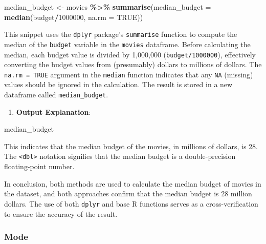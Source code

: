 \documentclass[
]{book}
\newenvironment{Shaded}{\begin{snugshade}}{\end{snugshade}}
\newcommand{\AttributeTok}[1]{\textcolor[rgb]{0.13,0.29,0.53}{#1}}
\newcommand{\ConstantTok}[1]{\textcolor[rgb]{0.56,0.35,0.01}{#1}}
\newcommand{\DecValTok}[1]{\textcolor[rgb]{0.00,0.00,0.81}{#1}}
\newcommand{\FunctionTok}[1]{\textcolor[rgb]{0.13,0.29,0.53}{\textbf{#1}}}
\newcommand{\NormalTok}[1]{#1}
\newcommand{\OtherTok}[1]{\textcolor[rgb]{0.56,0.35,0.01}{#1}}
\newcommand{\SpecialCharTok}[1]{\textcolor[rgb]{0.81,0.36,0.00}{\textbf{#1}}}
\providecommand{\tightlist}{%
  \setlength{\itemsep}{0pt}\setlength{\parskip}{0pt}}
\begin{document}
\begin{Shaded}
\begin{Highlighting}[]
\NormalTok{median\_budget }\OtherTok{\textless{}{-}}\NormalTok{ movies }\SpecialCharTok{\%\textgreater{}\%}
  \FunctionTok{summarise}\NormalTok{(}\AttributeTok{median\_budget =} \FunctionTok{median}\NormalTok{(budget}\SpecialCharTok{/}\DecValTok{1000000}\NormalTok{, }\AttributeTok{na.rm =} \ConstantTok{TRUE}\NormalTok{))}
\end{Highlighting}
\end{Shaded}

This snippet uses the \texttt{dplyr} package's \texttt{summarise} function to compute the median of the \texttt{budget} variable in the \texttt{movies} dataframe. Before calculating the median, each budget value is divided by 1,000,000 (\texttt{budget/1000000}), effectively converting the budget values from (presumably) dollars to millions of dollars. The \texttt{na.rm\ =\ TRUE} argument in the \texttt{median} function indicates that any \texttt{NA} (missing) values should be ignored in the calculation. The result is stored in a new dataframe called \texttt{median\_budget}.

\begin{enumerate}
\def\labelenumi{\arabic{enumi}.}
\setcounter{enumi}{1}
\tightlist
\item
  \textbf{Output Explanation}:
\end{enumerate}

\begin{Shaded}
\begin{Highlighting}[]
\NormalTok{median\_budget}
\end{Highlighting}
\end{Shaded}

This indicates that the median budget of the movies, in millions of dollars, is 28. The \texttt{\textless{}dbl\textgreater{}} notation signifies that the median budget is a double-precision floating-point number.

In conclusion, both methods are used to calculate the median budget of movies in the dataset, and both approaches confirm that the median budget is 28 million dollars. The use of both \texttt{dplyr} and base R functions serves as a cross-verification to ensure the accuracy of the result.

\hypertarget{mode}{%
\subsubsection*{Mode}\label{mode}}
\end{document}
